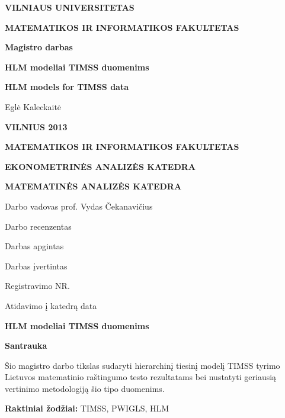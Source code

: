 \documentclass[12pt,a4paper]{article}
\begin{document}
\begin{titlepage}
\vskip 20pt
\centerline{\bf \large VILNIAUS UNIVERSITETAS}
\bigskip
\centerline{\large \textbf{MATEMATIKOS IR INFORMATIKOS FAKULTETAS}}

\vskip 120pt
\centerline{\bf \Large \textbf{Magistro darbas}}
\vskip 50pt
\begin{center}
{\bf \LARGE HLM modeliai TIMSS duomenims}
\end{center}
\bigskip
\begin{center}
{\bf \Large HLM models for TIMSS data}
\end{center}
\bigskip
\centerline{\Large Eglė Kaleckaitė }
\vskip 90pt
\vskip 120pt
\centerline{\large \textbf{VILNIUS 2013}}
\end{titlepage}
\begin{titlepage}
\centerline {\bf \large MATEMATIKOS IR INFORMATIKOS FAKULTETAS}
\centerline {\bf EKONOMETRINĖS ANALIZĖS KATEDRA}
\centerline {\bf MATEMATINĖS ANALIZĖS KATEDRA}

\vskip 120pt
\large Darbo vadovas prof. Vydas Čekanavičius

\large Darbo recenzentas \underline{\hskip 265pt}
\vskip 150pt

{\large Darbas apgintas \underline{\hskip 98pt }}

\large Darbas įvertintas \underline{\hskip 94pt }

\vskip 120pt

{\large Registravimo NR. \underline{\hskip 95pt }

Atidavimo į katedrą data \underline{\hskip 135pt} }

\end{titlepage}

\newpage
\pagestyle{plain}
\tableofcontents

\newpage

\begin{center}{\large\textbf{HLM modeliai TIMSS duomenims}}\end{center}

\begin{small}
\vspace{2\baselineskip}
\begin{center}\textbf{Santrauka}\end{center}

\indent Šio magistro darbo tikslas sudaryti hierarchinį tiesinį modelį TIMSS tyrimo Lietuvos matematinio raštingumo testo rezultatams bei nustatyti geriausią vertinimo metodologiją šio tipo duomenims.
\vspace{\baselineskip}

\noindent\textbf{Raktiniai žodžiai:}
TIMSS, PWIGLS, HLM
\end{small}
\vspace{\baselineskip}
\thispagestyle{empty}
\end{document}
